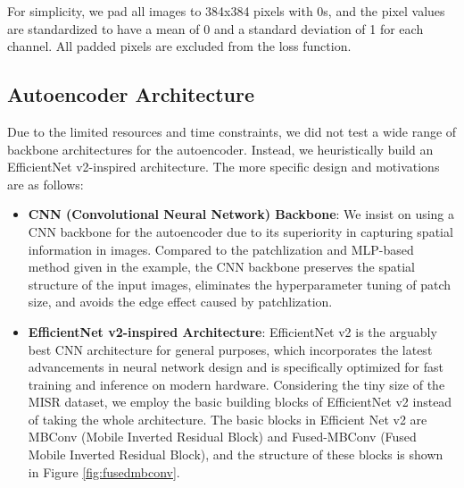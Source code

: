 \documentclass[10pt,letterpaper]{article}
\begin{document}
For simplicity, we pad all images to 384x384 pixels with 0s, and the pixel values are standardized to have a mean of 0 and a standard deviation of 1 for each channel. All padded pixels are excluded from the loss function.

\subsection{Autoencoder Architecture}

Due to the limited resources and time constraints, we did not test a wide range of backbone architectures for the autoencoder. Instead, we heuristically build an EfficientNet v2-inspired architecture. The more specific design and motivations are as follows:

\begin{itemize}
    \item \textbf{CNN (Convolutional Neural Network) Backbone}: We insist on using a CNN backbone for the autoencoder due to its superiority in capturing spatial information in images. Compared to the patchlization and MLP-based method given in the example, the CNN backbone preserves the spatial structure of the input images, eliminates the hyperparameter tuning of patch size, and avoids the edge effect caused by patchlization.

    \item \textbf{EfficientNet v2-inspired Architecture}: EfficientNet v2 \cite{tan2021efficientnetv2} is the arguably best CNN architecture for general purposes, which incorporates the latest advancements in neural network design and is specifically optimized for fast training and inference on modern hardware. Considering the tiny size of the MISR dataset, we employ the basic building blocks of EfficientNet v2 instead of taking the whole architecture. The basic blocks in Efficient Net v2 are MBConv (Mobile Inverted Residual Block) and Fused-MBConv (Fused Mobile Inverted Residual Block), and the structure of these blocks is shown in Figure \ref{fig:fusedmbconv}.


\end{itemize}
\end{document}
